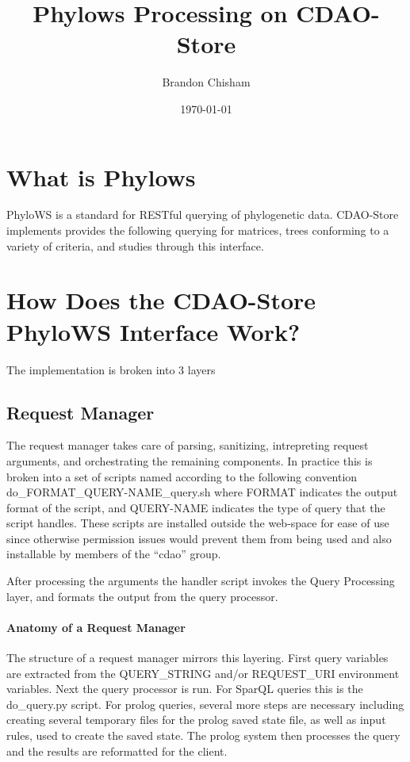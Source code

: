 \documentclass[10pt]{article}
\author{Brandon Chisham}
\title{Phylows Processing on CDAO-Store}
\date{\today}
\begin{document}
\maketitle
\section{What is Phylows}
PhyloWS is a standard for RESTful querying of phylogenetic data. 
CDAO-Store implements provides the following querying for matrices,
trees conforming to a variety of criteria, and studies through this
interface.

\section{How Does the CDAO-Store PhyloWS Interface Work?}
The implementation is broken into 3 layers
  \subsection{Request Manager}
    The request manager takes care of parsing, sanitizing, intrepreting request arguments, and orchestrating  
   the remaining components. 
     In practice this is broken into a set of scripts named according to the following convention 
     do\_FORMAT\_QUERY-NAME\_query.sh where FORMAT indicates the output format of the script, and QUERY-NAME
     indicates the type of query that the script handles. These scripts are installed outside the web-space for
     ease of use since otherwise permission issues would prevent them from being used and also installable by
     members of the ``cdao'' group.

     After processing the arguments the handler script invokes the Query Processing layer, and formats the output
     from the query processor.

     \paragraph{Anatomy of a Request Manager}
      The structure of a request manager mirrors this layering. First query variables are extracted from the QUERY\_STRING
      and/or REQUEST\_URI environment variables. 
      Next the query processor is run. For SparQL queries this is the do\_query.py script. For prolog queries, several more
      steps are necessary including creating several temporary files for the prolog saved state file, as well as input rules, 
      used to create the saved state. The prolog system then processes the query and the results are reformatted for the client.
\end{document}
